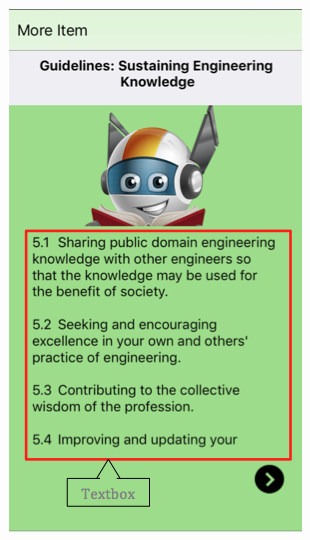 \begin{figure}[H]\centering
    \begin{subfigure}{0.27\textwidth}
\includegraphics[width=\textwidth]{text1}
\caption{}
    \end{subfigure}\hspace{0.06\textwidth}
 \begin{subfigure}{0.27\textwidth}

\end{subfigure}
\end{figure}
